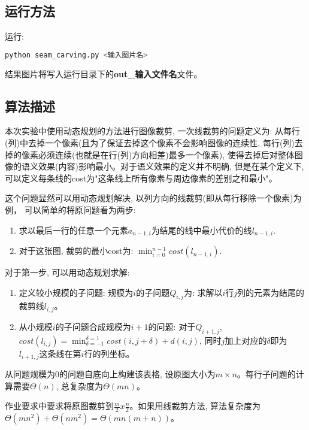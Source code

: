 \documentclass[paper=a4, fontsize=11pt]{scrartcl} %
\numberwithin{equation}{section} %
\numberwithin{figure}{section} %
\numberwithin{table}{section} %
\begin{document}
\subsection{运行方法}

运行:
\begin{lstlisting}[language=bash]
  python seam_carving.py <输入图片名>
\end{lstlisting}
结果图片将写入运行目录下的\textbf{out\_输入文件名}文件。

\subsection{算法描述}
本次实验中使用动态规划的方法进行图像裁剪, 一次线裁剪的问题定义为: 从每行(列)中去掉一个像素(且为了保证去掉这个像素不会影响图像的连续性, 每行(列)去掉的像素必须连续(也就是在行(列)方向相差)最多一个像素), 使得去掉后对整体图像的语义效果(内容)影响最小。对于语义效果的定义并不明确, 但是在某个定义下, 可以定义每条线的cost为"这条线上所有像素与周边像素的差别之和最小"。

这个问题显然可以用动态规划解决, 以列方向的线裁剪(即从每行移除一个像素)为例， 可以简单的将原问题看为两步:
\begin{enumerate}
\item 求以最后一行的任意一个元素$a_{n-1,i}$为结尾的线中最小代价的线$l_{n-1, i}$.
\item 对于这张图, 裁剪的最小cost为: $\min_{i=0}^{n-1} cost(l_{n-1, i})$.
\end{enumerate}

对于第一步, 可以用动态规划求解:
\begin{enumerate}
\item 定义较小规模的子问题: 规模为$i$的子问题$Q_{i,j}$为: 求解以$i$行$j$列的元素为结尾的裁剪线$l_{i,j}$。
\item 从小规模$i$的子问题合成规模为$i+1$的问题: 对于$Q_{i+1,j}$, $cost(l_{i,j}) = \min_{\delta=-1}^{\delta=1}{cost(i, j + \delta)} + d(i, j)$, 同时$j$加上对应的$\delta$即为$l_{i+1,j}$这条线在第$i$行的列坐标。
\end{enumerate}
从问题规模为0的问题自底向上构建该表格, 设原图大小为$m \times n$。每行子问题的计算需要$\Theta(n)$, 总复杂度为$\Theta(mn)$。

作业要求中要求将原图裁剪到$\frac{m}{2} x \frac{n}{2}$。如果用线裁剪方法, 算法复杂度为$\Theta(mn^2) + \Theta(nm^2) = \Theta(mn(m+n))$。
\end{document}
